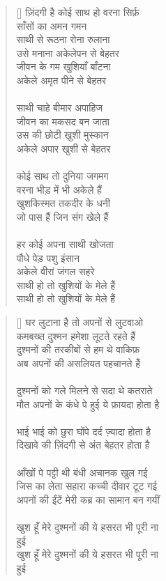 \begin{verse}[\versewidth]
{ज़िंदगी है कोई साथ हो वरना सिर्फ़\\
साँसों का अमन गमन\\
साथी से रूठना रोना रुलाना\\
उसे मनाना अकेलेपन से बेहतर\\
जीवन के गम खुशियाँ बाँटना\\
अकेले अमृत पीने से बेहतर\\
\\
साथी चाहे बीमार अपाहिज\\
जीवन का मकसद बन जाता\\
उस की छोटी खुशी मुस्कान\\
अकेले अपार खुशी से बेहतर\\
\\
कोई साथ तो दुनिया जगमग\\
वरना भीड़ में भी अकेले हैं\\
खुशकिस्मत तकदीर के धनी\\
जो पास हैं जिन संग खेले हैं\\
\\
हर कोई अपना साथी खोजता\\
पौधे पेड़ पशु इंसान\\
अकेले वीरां जंगल सहरे\\
साथी हो तो खुशियों के मेले हैं\\
साथी हो तो खुशियों के मेले हैं
}\end{verse}

\begin{verse}[\versewidth]\texthindi{
घर लुटाना है तो अपनों से लुटवाओ\\
कमबख्त दुश्मन हमेशा लूटते रहते हैं\\
दुश्मनों की तरकीबों से हम थे वाकिफ़\\
अब अपनों की असलियत पहचानते हैं\\
\\
दुश्मनों को गले मिलने से सदा थे कतराते\\
मौत अपनों के कंधे पे हुई ये फ़ायदा होता है\\
\\
भाई भाई को छुरा घोंपे दर्द ज़्यादा होता है\\
दिखावे की ज़िंदगी से अंत बेहतर होता है\\
\\
आँखों पे पट्टी थी बंधी अचानक खुल गई\\
जिस का लेता सहारा कच्ची दीवार टूट गई\\
अपनों की ईंटें मेरी कब्र का सामान बन गयीं\\
\\
खुश हूँ मेरे दुश्मनों की ये हसरत भी पूरी ना\\
हुई\\
खुश हूँ मेरे दुश्मनों की ये हसरत भी पूरी ना\\
हुई
}\end{verse}

